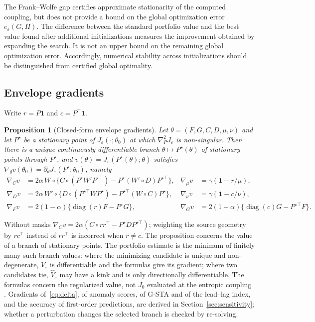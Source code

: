 \documentclass[12pt]{article}
\newtheorem{proposition}{Proposition}
\theoremstyle{definition}
\begin{document}
The Frank--Wolfe gap certifies approximate stationarity of the computed coupling, but does not provide a bound on the global optimization error $e_\varepsilon(G,H)$.
The difference between the standard portfolio value and the best value found after additional initializations measures the improvement obtained by expanding the search. It is not an upper bound on the remaining global optimization error.
Accordingly, numerical stability across initializations should be distinguished from certified global optimality.

\subsection{Envelope gradients}

Write $r=P\mathbf1$ and $c=P^\top\mathbf1$.

\begin{proposition}[Closed-form envelope gradients]\label{prop:envelope}
Let $\theta=(F,G,C,D,\mu,\nu)$ and let $P^\star$ be a stationary point of $J_\varepsilon(\cdot;\theta_0)$ at which $\nabla^2_PJ_\varepsilon$ is non-singular. Then there is a unique continuously differentiable branch $\theta\mapsto P^\star(\theta)$ of stationary points through $P^\star$, and $v(\theta)=J_\varepsilon(P^\star(\theta);\theta)$ satisfies $\nabla_\theta v(\theta_0)=\partial_\theta J_\varepsilon(P^\star;\theta_0)$, namely
\begin{align*}
\nabla_C v&=2\alpha\,W\circ\{C\circ(P^\star W'P^{\star\top})-P^\star(W'\circ D)P^{\star\top}\},&
\nabla_\mu v&=\gamma(\mathbf 1-r/\mu),\\
\nabla_D v&=2\alpha\,W'\circ\{D\circ(P^{\star\top}WP^\star)-P^{\star\top}(W\circ C)P^\star\},&
\nabla_\nu v&=\gamma(\mathbf 1-c/\nu),\\
\nabla_F v&=2(1-\alpha)\{\operatorname{diag}(r)F-P^\star G\},&
\nabla_G v&=2(1-\alpha)\{\operatorname{diag}(c)G-P^{\star\top}F\}.
\end{align*}
\end{proposition}

Without masks $\nabla_Cv=2\alpha(C\circ rr^\top-P^\star DP^{\star\top})$; weighting the source geometry by $rc^\top$ instead of $rr^\top$ is incorrect when $r\neq c$. The proposition concerns the value of a branch of stationary points. The portfolio estimate is the minimum of finitely many such branch values: where the minimizing candidate is unique and non-degenerate, $\widehat V_\varepsilon$ is differentiable and the formulas give its gradient; where two candidates tie, $\widehat V_\varepsilon$ may have a kink and is only directionally differentiable. The formulas concern the regularized value, not $J_0$ evaluated at the entropic coupling \citep[compare][]{luise2018differential}. Gradients of~\eqref{eq:delta}, of anomaly scores, of G-STA and of the lead--lag index, and the accuracy of first-order predictions, are derived in Section~\ref{sec:sensitivity}; whether a perturbation changes the selected branch is checked by re-solving.
\end{document}
